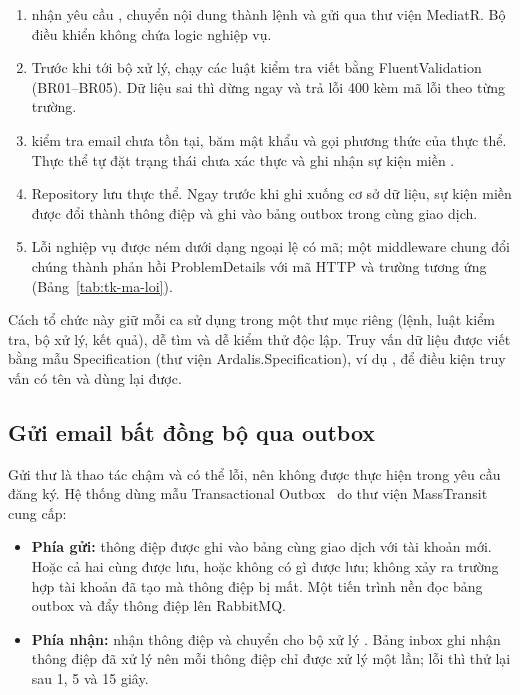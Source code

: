 \begin{enumerate}
  \item {} nhận yêu cầu , chuyển nội dung thành lệnh
   và gửi qua thư viện MediatR. Bộ điều khiển không chứa logic nghiệp vụ.
  \item Trước khi tới bộ xử lý,  chạy các luật kiểm tra viết bằng FluentValidation
  (BR01--BR05). Dữ liệu sai thì dừng ngay và trả lỗi 400 kèm mã lỗi theo từng trường.
  \item {} kiểm tra email chưa tồn tại, băm mật khẩu và gọi phương thức
   của thực thể. Thực thể tự đặt trạng thái chưa xác thực và ghi nhận sự kiện miền
  .
  \item Repository lưu thực thể. Ngay trước khi ghi xuống cơ sở dữ liệu, sự kiện miền được đổi thành
  thông điệp  và ghi vào bảng outbox trong cùng giao dịch.
  \item Lỗi nghiệp vụ được ném dưới dạng ngoại lệ có mã; một middleware chung đổi chúng thành phản hồi
  ProblemDetails với mã HTTP và trường  tương ứng (Bảng~\ref{tab:tk-ma-loi}).
\end{enumerate}

Cách tổ chức này giữ mỗi ca sử dụng trong một thư mục riêng (lệnh, luật kiểm tra, bộ xử lý, kết quả),
dễ tìm và dễ kiểm thử độc lập. Truy vấn dữ liệu được viết bằng mẫu Specification (thư viện
Ardalis.Specification), ví dụ , để điều kiện truy vấn có tên và dùng lại được.

\subsection{Gửi email bất đồng bộ qua outbox}

Gửi thư là thao tác chậm và có thể lỗi, nên không được thực hiện trong yêu cầu đăng ký. Hệ thống dùng
mẫu Transactional Outbox~\cite{outbox} do thư viện MassTransit cung cấp:

\begin{itemize}
  \item \textbf{Phía gửi:} thông điệp được ghi vào bảng  cùng giao dịch với tài
  khoản mới. Hoặc cả hai cùng được lưu, hoặc không có gì được lưu; không xảy ra trường hợp tài khoản đã
  tạo mà thông điệp bị mất. Một tiến trình nền đọc bảng outbox và đẩy thông điệp lên RabbitMQ.
  \item \textbf{Phía nhận:}  nhận thông điệp và chuyển cho bộ xử lý
  . Bảng inbox ghi nhận thông điệp đã xử lý nên mỗi thông
  điệp chỉ được xử lý một lần; lỗi thì thử lại sau 1, 5 và 15 giây.
\end{itemize}

